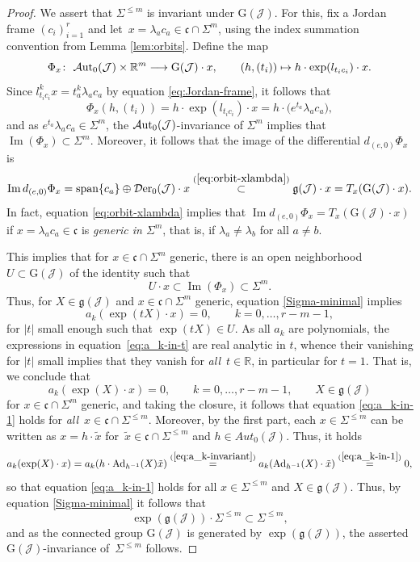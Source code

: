 \documentclass[pdftex]{sigma}
\numberwithin{equation}{section}
\newcommand{\be}{\begin{equation}}
\newcommand{\ee}{\end{equation}}
\newcommand{\Aut}{\mathcal{A}{\rm ut}}
\newcommand{\Der}{\mathcal{D}{\rm er}}
\newcommand{\Jcal}{\mathcal{J}}
\newcommand{\G}{\mathrm{G}}
\newcommand{\R}{{\mathbb R}}
\newcommand{\g}{{\mathfrak{g}}}
\newcommand{\cf}{{\mathfrak c}}
\newcommand{\sspan}{{\mathrm{span}}}
\begin{document}
\begin{proof}
We assert that $\Sigma^{\leq m}$ is invariant under $\G(\Jcal)$. For this, fix a Jordan frame $(c_i)_{i=1}^r$ and let~$x = \lambda_a c_a \in \cf \cap \Sigma^m$, using the index summation convention from Lemma \ref{lem:orbits}. Define the map
\[
\Phi_x\colon\ \Aut_0(\Jcal) \times \R^m \longrightarrow \G(\Jcal) \cdot x, \qquad (h, (t_i)) \mapsto h \cdot \exp(l_{t_i c_i}) \cdot x.
\]
Since $l_{t_i c_i}^k x = t_a^k \lambda_a c_a$ by equation \eqref{eq:Jordan-frame}, it follows that
\be \label{eq:action-diag}
\Phi_x(h, (t_i)) = h \cdot \exp(l_{t_i c_i}) \cdot x = h \cdot \big(e^{t_a} \lambda_a c_a\big),
\ee
and as $e^{t_a} \lambda_a c_a \in \Sigma^m$, the $\Aut_0(\Jcal)$-invariance of $\Sigma^m$ implies that $\operatorname{Im}(\Phi_x) \subset \Sigma^m$. Moreover, it follows that the image of the differential $d_{(e,0)} \Phi_x$ is
\[ %
\operatorname{Im} d_{(e,0)} \Phi_x = \sspan\{c_a\} \oplus \Der_0(\Jcal) \cdot x \stackrel{(\ref{eq:orbit-xlambda})}\subset \g(\Jcal) \cdot x = T_x(\G(\Jcal) \cdot x).
\]
In fact, equation \eqref{eq:orbit-xlambda} implies that $\operatorname{Im} d_{(e,0)} \Phi_x = T_x(\G(\Jcal) \cdot x)$ if $x = \lambda_a c_a \in \cf$ is {\em generic in $\Sigma^m$}, that is, if $\lambda_a \neq \lambda_b$ for all $a \neq b$.

This implies that for $x \in \cf \cap \Sigma^m$ generic, there is an open neighborhood $U \subset \G(\Jcal)$ of the identity such that
\[ %
U \cdot x \subset \operatorname{Im}(\Phi_x) \subset \Sigma^m.
\]
Thus, for $X \in \g(\Jcal)$ and $x \in \cf \cap \Sigma^m$ generic, equation \eqref{Sigma-minimal} implies
\be \label{eq:a_k-in-t}
a_k(\exp(tX) \cdot x) = 0, \qquad k = 0, \dots, r-m-1,
\ee
for $|t|$ small enough such that $\exp(tX) \in U$. As all $a_k$ are polynomials, the expressions in equation~\eqref{eq:a_k-in-t} are real analytic in $t$, whence their vanishing for $|t|$ small implies that they vanish for {\em all}~$t \in \R$, in particular for $t=1$. That is, we conclude that
\be \label{eq:a_k-in-1}
a_k(\exp(X) \cdot x) = 0, \qquad k = 0, \dots, r-m-1, \qquad X \in \g(\Jcal)
\ee
for $x \in \cf \cap \Sigma^m$ generic, and taking the closure, it follows that equation \eqref{eq:a_k-in-1} holds for {\em all}~${x \in \cf \cap \Sigma^{\leq m}}$.
Moreover, by the first part, each $x \in \Sigma^{\leq m}$ can be written as $x = h \cdot \tilde x$ for~$\tilde x \in \cf \cap \Sigma^{\leq m}$ and $h \in Aut_0(\Jcal)$. Thus, it holds
\[
a_k(\exp(X) \cdot x) = a_k( h \cdot \operatorname{Ad}_{h^{-1}}(X) \tilde x) \stackrel{(\ref{eq:a_k-invariant})}= a_k(\operatorname{Ad}_{h^{-1}}(X) \cdot \tilde x) \stackrel{(\ref{eq:a_k-in-1})} = 0,
\]
so that equation \eqref{eq:a_k-in-1} holds for all $x \in \Sigma^{\leq m}$ and $X \in \g(\Jcal)$.
Thus, by equation \eqref{Sigma-minimal} it follows that
\[
\exp(\g(\Jcal)) \cdot \Sigma^{\leq m} \subset \Sigma^{\leq m},
\]
and as the connected group $\G(\Jcal)$ is generated by $\exp(\g(\Jcal))$, the asserted $\G(\Jcal)$-invariance of~$\Sigma^{\leq m}$ follows.


\end{proof}
\end{document}
